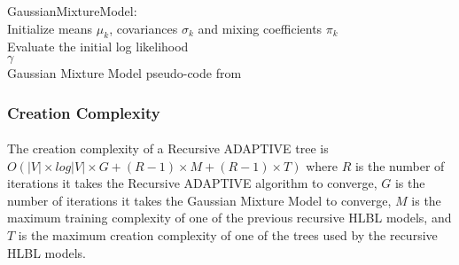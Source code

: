 \documentclass[12pt]{ociamthesis}  %
\begin{document}
\begin{algorithm} \label{code:GMM}
\SetAlgoLined
GaussianMixtureModel:
\\
Initialize means $\mu_k$, covariances $\sigma_k$ and mixing coefficients $\pi_k$
\\Evaluate the initial log likelihood
\\
\Return $\gamma$
\\
Gaussian Mixture Model pseudo-code from \cite{Bishop2006}
\end{algorithm} 

\subsubsection{Creation Complexity}
\paragraph{}
The creation complexity of a Recursive ADAPTIVE tree is $O ( |V| \times log|V| \times G + (R-1)\times M + (R-1)\times T)$ where $R$ is the number of iterations it takes the Recursive ADAPTIVE algorithm to converge, $G$ is the number of iterations it takes the Gaussian Mixture Model to converge, $M$ is the maximum training complexity of one of the previous recursive HLBL models, and $T$ is the maximum creation complexity of one of the trees used by the recursive HLBL models. 

\renewcommand{\bibname}{References}
\end{document}
